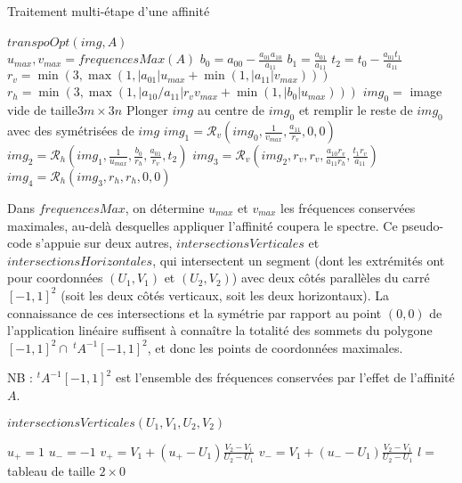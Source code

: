    \begin{algorithme}
    \caption{Traitement multi-étape d'une affinité}
    $transpoOpt(img,A)$\;\ \\
    $u_{max}, v_{max} = frequencesMax(A)$\;
	$b_0 = a_{00}-\frac{a_{01}a_{10}}{a_{11}}$\;
	$b_1 = \frac{a_{01}}{a_{11}}$\;
	$t_2 = t_0 - \frac{a_{01}t_1}{a_{11}}$\;
	$r_v = \min(3,\max (1,|a_{01}|u_{max}+\min (1,|a_{11}|v_{max})))$\;
	$r_h = \min(3,\max (1,|a_{10}/a_{11}|r_vv_{max}+\min (1,|b_0|u_{max})))$\;
	$img_0 =$ image vide de taille$3m \times 3n$\;
	Plonger $img$ au centre de $img_0$ et remplir le reste de $img_0$ avec des symétrisées de $img$\;
	$img_1 = \mathcal{R}_v(img_0,\frac{1}{v_{max}},\frac{a_{11}}{r_v},0,0)$\;
	$img_2 = \mathcal{R}_h(img_1,\frac{1}{u_{max}},\frac{b_0}{r_h},\frac{a_{01}}{r_v},t_2)$\;
	$img_3 = \mathcal{R}_v(img_2,r_v,r_v,\frac{a_{10}r_v}{a_{11}r_h},\frac{t_1r_v}{a_{11}})$\;
	$img_4 = \mathcal{R}_h(img_3,r_h,r_h,0,0)$\;
    \label{szeliski_szeliski}
   \end{algorithme}










  Dans $frequencesMax$, on détermine $u_{max}$ et $v_{max}$ les fréquences conservées maximales, au-delà desquelles appliquer l'affinité coupera le spectre. Ce pseudo-code s'appuie sur deux autres, $intersectionsVerticales$ et $intersectionsHorizontales$, qui intersectent un segment (dont les extrémités ont pour coordonnées $(U_1,V_1)$ et $(U_2,V_2)$) avec deux côtés parallèles du carré $[-1,1]^2$ (soit les deux côtés verticaux, soit les deux horizontaux). La connaissance de ces intersections et la symétrie par rapport au point $(0,0)$ de l'application linéaire suffisent à connaître la totalité des sommets du polygone $[-1,1]^2 \cap \ ^t\!\!A^{-1}[-1,1]^2$, et donc les points de coordonnées maximales.
  
  NB : $^t\!\!A^{-1}[-1,1]^2$ est l'ensemble des fréquences conservées par l'effet de l'affinité $A$.
  
  \begin{algorithme}
   \caption{$intersectionsVerticales(U_1,V_1,U_2,V_2)$}
   $u_+ = 1$\;
   $u_- = -1$\;
   $v_+ = V_1+(u_+-U_1)\frac{V_2-V_1}{U_2-U_1}$\;
   $v_- = V_1+(u_--U_1)\frac{V_2-V_1}{U_2-U_1}$\;
   $l =$ tableau de taille $2 \times 0$\;
  \end{algorithme}










